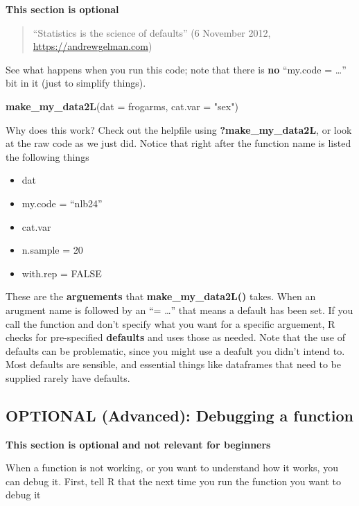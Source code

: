 \documentclass[]{book}
\newenvironment{Shaded}{\begin{snugshade}}{\end{snugshade}}
\newcommand{\KeywordTok}[1]{\textcolor[rgb]{0.13,0.29,0.53}{\textbf{#1}}}
\newcommand{\DataTypeTok}[1]{\textcolor[rgb]{0.13,0.29,0.53}{#1}}
\newcommand{\StringTok}[1]{\textcolor[rgb]{0.31,0.60,0.02}{#1}}
\newcommand{\NormalTok}[1]{#1}
\providecommand{\tightlist}{%
  \setlength{\itemsep}{0pt}\setlength{\parskip}{0pt}}
\theoremstyle{definition}
\theoremstyle{definition}
\theoremstyle{definition}
\theoremstyle{remark}
\begin{document}
\textbf{This section is optional}

\begin{quote}
``Statistics is the science of defaults'' (6 November 2012,
\url{https://andrewgelman.com})
\end{quote}

See what happens when you run this code; note that there is \textbf{no}
``my.code = \ldots{}'' bit in it (just to simplify things).

\begin{Shaded}
\begin{Highlighting}[]
\KeywordTok{make_my_data2L}\NormalTok{(}\DataTypeTok{dat =}\NormalTok{ frogarms, }\DataTypeTok{cat.var =} \StringTok{"sex"}\NormalTok{)}
\end{Highlighting}
\end{Shaded}

Why does this work? Check out the helpfile using
\textbf{?make\_my\_data2L}, or look at the raw code as we just did.
Notice that right after the function name is listed the following things

\begin{itemize}
\tightlist
\item
  dat
\item
  my.code = ``nlb24''
\item
  cat.var
\item
  n.sample = 20
\item
  with.rep = FALSE
\end{itemize}

These are the \textbf{arguements} that \textbf{make\_my\_data2L()}
takes. When an arugment name is followed by an ``= \ldots{}'' that means
a default has been set. If you call the function and don't specify what
you want for a specific arguement, R checks for pre-specified
\textbf{defaults} and uses those as needed. Note that the use of
defaults can be problematic, since you might use a deafult you didn't
intend to. Most defaults are sensible, and essential things like
dataframes that need to be supplied rarely have defaults.

\subsection{OPTIONAL (Advanced): Debugging a
function}\label{optional-advanced-debugging-a-function}

\textbf{This section is optional and not relevant for beginners}

When a function is not working, or you want to understand how it works,
you can debug it. First, tell R that the next time you run the function
you want to debug it
\end{document}
